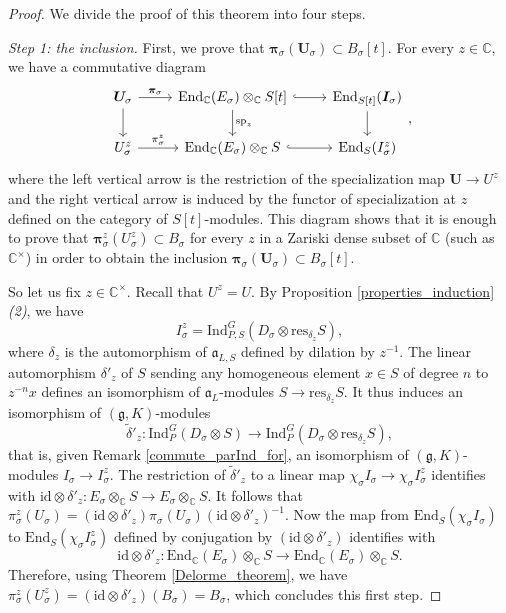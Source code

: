 \documentclass{amsart}
\theoremstyle{definition}
\begin{document}
\begin{proof}
    We divide the proof of this theorem into four steps.

\smallskip

\textit{Step 1: the inclusion.}
    First, we prove that $\bm{\pi}_\sigma(\bm{U}_\sigma) \subset B_\sigma[t]$. For every $z \in \mathbb{C}$, we have a commutative diagram
    \[\begin{tikzcd}
        \bm{U}_\sigma \ar[r, "\bm{\pi}_\sigma"] \ar[d] & \mathrm{End}_\mathbb{C}(E_\sigma) \otimes_\mathbb{C} S[t] \ar[d, "\mathrm{sp}_z"] \ar[r, hookrightarrow] & \mathrm{End}_{S[t]}(\bm{I}_\sigma) \ar[d] \\
        U^z_\sigma \ar[r, "\pi_\sigma^z"] &\mathrm{End}_\mathbb{C}(E_\sigma) \otimes_\mathbb{C} S \ar[r, hookrightarrow] & \mathrm{End}_S(I_\sigma^z)
    \end{tikzcd},\]
    where the left vertical arrow is the restriction of the specialization map $\bm{U} \to U^z$ and the right vertical arrow is induced by the functor of specialization at $z$ defined on the category of $S[t]$-modules.
    This diagram shows that it is enough to prove that $\bm{\pi}^z_\sigma(U^z_\sigma) \subset B_\sigma$ for every $z$ in a Zariski dense subset of $\mathbb{C}$ (such as $\mathbb{C}^\times$) in order to obtain the inclusion $\bm{\pi}_\sigma(\bm{U}_\sigma) \subset B_\sigma[t]$.

    So let us fix $z \in \mathbb{C}^\times$. Recall that $U^z = U$. By Proposition \ref{properties_induction}\textit{(2)}, we have
    \[I_\sigma^z = \mathrm{Ind}_{P,S}^G(D_\sigma \otimes \mathrm{res}_{\delta_z}S),\]
    where $\delta_z$ is the automorphism of $\mathfrak{a}_{L,S}$ defined by dilation by $z^{-1}$. The linear automorphism $\delta'_z$ of $S$ sending any homogeneous element $x \in S$ of degree $n$ to $z^{-n}x$ defines an isomorphism of $\mathfrak{a}_L$-modules $S \to \mathrm{res}_{\delta_z}S$. It thus induces an isomorphism of $(\mathfrak{g},K)$-modules
    \[\tilde{\delta}'_z : \mathrm{Ind}_P^G(D_\sigma \otimes S) \to \mathrm{Ind}_P^G(D_\sigma  \otimes \mathrm{res}_{\delta_{z}}S),\]
    that is, given Remark \ref{commute_parInd_for}, an isomorphism of $(\mathfrak{g},K)$-modules $I_\sigma \to I_\sigma^z$. The restriction of $\tilde\delta'_z$ to a linear map $\chi_\sigma I_\sigma \to \chi_\sigma I_\sigma^z$ identifies with \(\mathrm{id} \otimes \delta'_z : E_\sigma \otimes_\mathbb{C} S \to E_\sigma \otimes_\mathbb{C} S\).
    It follows that $\pi_\sigma^z(U_\sigma) = (\mathrm{id} \otimes \delta'_z) \pi_\sigma(U_\sigma)(\mathrm{id} \otimes \delta'_z)^{-1}$. Now the map from $\mathrm{End}_S(\chi_\sigma I_\sigma)$ to $\mathrm{End}_S(\chi_\sigma I_\sigma^z)$ defined by conjugation by $(\mathrm{id} \otimes \delta'_z)$ identifies with \begin{equation}\label{rescaling}\mathrm{id} \otimes \delta'_z : \mathrm{End}_\mathbb{C}(E_\sigma) \otimes_\mathbb{C} S \to \mathrm{End}_\mathbb{C}(E_\sigma) \otimes_\mathbb{C} S.\end{equation}
    Therefore, using Theorem \ref{Delorme_theorem}, we have $\pi^z_\sigma(U^z_\sigma) = (\mathrm{id} \otimes \delta'_z)(B_\sigma) = B_\sigma$, which concludes this first step.
    

\end{proof}
\end{document}
